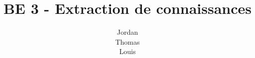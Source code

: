 \documentclass[a4paper, 11pt]{report}
\begin{document}
	\title{BE 3 - Extraction de connaissances}
	\author{Jordan \\ Thomas \\ Louis }

	\maketitle
\end{document}
